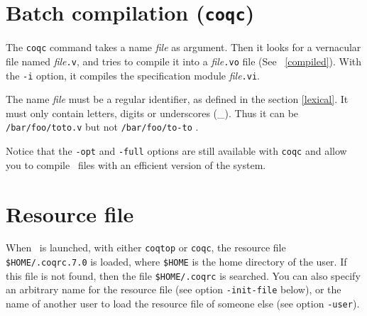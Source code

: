 \section{Batch compilation ({\tt coqc})}
The {\tt coqc} command takes a name {\em file} as argument.  Then it
looks for a vernacular file named {\em file}{\tt .v}, and tries to
compile it into a {\em file}{\tt .vo} file (See ~\ref{compiled}).
With the \verb!-i! option, it compiles the specification module {\em
file}{\tt .vi}. 

\Warning The name {\em file} must be a regular {\Coq} identifier, as
defined in the section \ref{lexical}. It
must only contain letters, digits or underscores
(\_). Thus it can be \verb+/bar/foo/toto.v+ but not 
\verb+/bar/foo/to-to+ . 

Notice that the \verb!-opt! and \verb!-full! options are still
available with \verb!coqc!  and allow you to compile \Coq\ files with
an efficient version of the system.


\section{Resource file}

When \Coq\ is launched, with either {\tt coqtop} or {\tt coqc}, the
resource file \verb:$HOME/.coqrc.7.0: is loaded, where \verb:$HOME: is
the home directory of the user.  If this file is not found, then the
file \verb:$HOME/.coqrc: is searched. You can also specify an
arbitrary name for the resource file (see option \verb:-init-file:
below), or the name of another user to load the resource file of
someone else (see option \verb:-user:).

